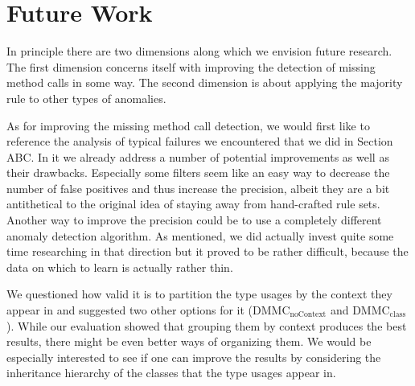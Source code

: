 \section{Future Work}

In principle there are two dimensions along which we envision future research.
The first dimension concerns itself with improving the detection of missing method calls in some way.
The second dimension is about applying the majority rule to other types of anomalies.

As for improving the missing method call detection, we would first like to reference the analysis of typical failures we encountered that we did in Section ABC.
In it we already address a number of potential improvements as well as their drawbacks.
Especially some filters seem like an easy way to decrease the number of false positives and thus increase the precision, albeit they are a bit antithetical to the original idea of staying away from hand-crafted rule sets.
Another way to improve the precision could be to use a completely different anomaly detection algorithm.
As mentioned, we did actually invest quite some time researching in that direction but it proved to be rather difficult, because the data on which to learn is actually rather thin.

We questioned how valid it is to partition the type usages by the context they appear in and suggested two other options for it ($\text{DMMC}_\text{noContext}$ and $\text{DMMC}_\text{class}$).
While our evaluation showed that grouping them by context produces the best results, there might be even better ways of organizing them.
We would be especially interested to see if one can improve the results by considering the inheritance hierarchy of the classes that the type usages appear in.

